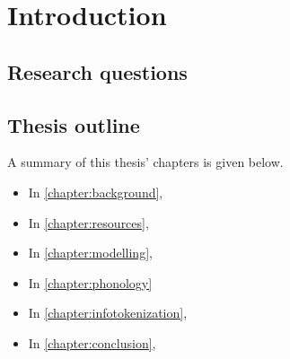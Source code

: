 \chapter{Introduction}







\section{Research questions}


\section{Thesis outline}

A summary of this thesis' chapters is given below.

\begin{itemize}
    \item In \cref{chapter:background},
    \item In \cref{chapter:resources},
    \item In \cref{chapter:modelling},
    \item In \cref{chapter:phonology}
    \item In \cref{chapter:infotokenization},
    \item In \cref{chapter:conclusion},
\end{itemize}

